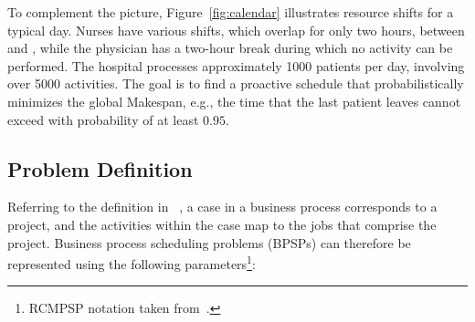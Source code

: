 To complement the picture, Figure~\ref{fig:calendar} illustrates resource shifts for a typical day. Nurses have various shifts, which overlap for only two hours, between  and , while the physician has a two-hour break during which no  activity can be performed. The hospital processes approximately 1000 patients per day, involving over 5000 activities. The goal is to find a proactive schedule that probabilistically minimizes the global Makespan, e.g., the time that the last patient leaves cannot exceed  with probability of at least $0.95$. 

\subsection{Problem Definition} 
Referring to the definition in ~\cite{sanchez2023survey}, a case in a business process corresponds to a project, and the activities within the case map to the jobs that comprise the project. Business process scheduling problems (BPSPs) can therefore be represented using the following parameters\footnote{RCMPSP notation taken from~\cite{sanchez2023survey}.}: 
